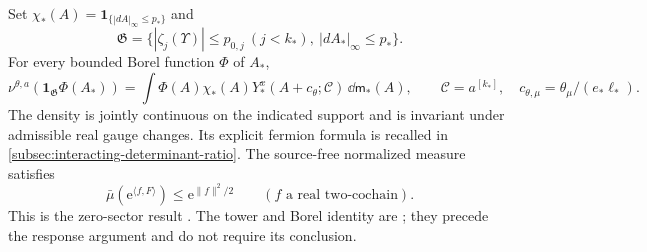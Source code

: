 Set $\chi_*(A)=\mathbf1_{\{|dA|_\infty\le p_*\}}$ and
\[
 \mathfrak G=\{|\zeta_j(\Upsilon)|\le p_{0,j}\ (j<k_*),\
                                  |dA_*|_\infty\le p_*\}.
\]
For every bounded Borel function $\Phi$ of $A_*$,
\begin{equation}\label{eq:rrm-terminal-Borel}
 \nu^{\theta,a}(\mathbf1_{\mathfrak G}\Phi(A_*))
 =\int\Phi(A)\chi_*(A)
             Y_*^x(A+c_\theta;\mathscr C)\,\dd\mathsf m_*(A),
 \qquad \mathscr C=a^{[k_*]},\quad
 c_{\theta,\mu}=\theta_\mu/(e_*\ell_*).
\end{equation}
The density is jointly continuous on the indicated support and is
invariant under admissible real gauge changes. Its explicit fermion
formula is recalled in \cref{subsec:interacting-determinant-ratio}.
The source-free normalized measure satisfies
\begin{equation}\label{eq:rrm-zero-Gaussian}
 \bar\mu(\mathrm e^{\langle f,F\rangle})\le \mathrm e^{\|f\|^2/2}
                 \qquad(f\text{ a real two-cochain}).
\end{equation}
This is the zero-sector result
\cite[Proposition~2.1]{TerminalPressure}.
The tower and Borel identity are
\cite[Proposition~3.1, Theorem~B]{TerminalPressure}; they precede
the response argument and do not require its conclusion.
